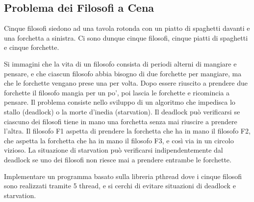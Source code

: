 \documentclass{article}
\numberwithin{equation}{subsection}
\begin{document}
\subsection{Problema dei Filosofi a Cena}

Cinque filosofi siedono ad una tavola rotonda con un piatto di spaghetti davanti e una forchetta a sinistra. Ci sono dunque cinque filosofi, cinque piatti di spaghetti e cinque forchette.

Si immagini che la vita di un filosofo consista di periodi alterni di mangiare e pensare, e che ciascun filosofo abbia bisogno di due forchette per mangiare, ma che le forchette vengano prese una per volta. Dopo essere riuscito a prendere due forchette il filosofo mangia per un po', poi lascia le forchette e ricomincia a pensare. Il problema consiste nello sviluppo di un algoritmo che impedisca lo stallo (deadlock) o la morte d'inedia (starvation). Il deadlock può verificarsi se ciascuno dei filosofi tiene in mano una forchetta senza mai riuscire a prendere l'altra. Il filosofo F1 aspetta di prendere la forchetta che ha in mano il filosofo F2, che aspetta la forchetta che ha in mano il filosofo F3, e così via in un circolo vizioso. La situazione di starvation può verificarsi indipendentemente dal deadlock se uno dei filosofi non riesce mai a prendere entrambe le forchette.

Implementare un programma basato sulla libreria pthread dove i cinque filosofi sono realizzati tramite 5 thread, e si cerchi di evitare situazioni di deadlock e starvation. 
\end{document}
